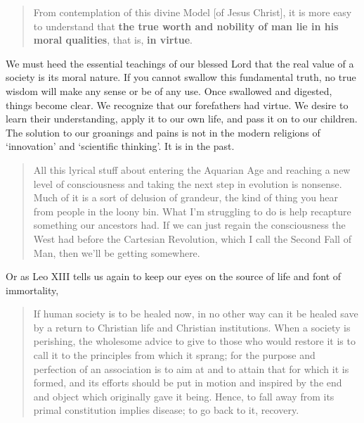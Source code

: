 \documentclass[letterpaper]{article}
\begin{document}
\begin{quote}
  From contemplation of this divine Model [of Jesus Christ], it is more easy to understand that \textbf{the true worth and nobility of man lie in his moral qualities}, that is, \textbf{in virtue}.
\end{quote}

We must heed the essential teachings of our blessed Lord that the real value of a society is its moral nature. If you cannot swallow this fundamental truth, no true wisdom will make any sense or be of any use. Once swallowed and digested, things become clear. We recognize that our forefathers had virtue. We desire to learn their understanding, apply it to our own life, and pass it on to our children. The solution to our groanings and pains is not in the modern religions of `innovation' and `scientific thinking'. It is in the past.

\begin{quote}
  All this lyrical stuff about entering the Aquarian Age and reaching a new level of consciousness and taking the next step in evolution is nonsense. Much of it is a sort of delusion of grandeur, the kind of thing you hear from people in the loony bin. What I'm struggling to do is help recapture something our ancestors had. If we can just regain the consciousness the West had before the Cartesian Revolution, which I call the Second Fall of Man, then we'll be getting somewhere.

\end{quote}

Or as Leo XIII tells us again to keep our eyes on the source of life and font of immortality,

\begin{quote}
  If human society is to be healed now, in no other way can it be healed save by a return to Christian life and Christian institutions. When a society is perishing, the wholesome advice to give to those who would restore it is to call it to the principles from which it sprang; for the purpose and perfection of an association is to aim at and to attain that for which it is formed, and its efforts should be put in motion and inspired by the end and object which originally gave it being. Hence, to fall away from its primal constitution implies disease; to go back to it, recovery.
\end{quote}
\end{document}
